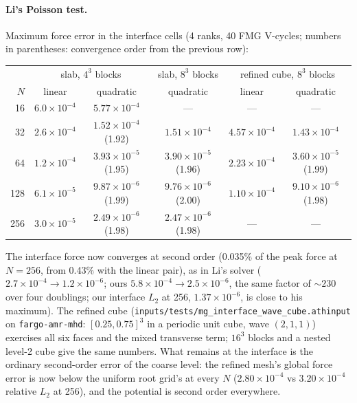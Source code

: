 \documentclass[11pt]{article}
\newcommand{\code}[1]{\texttt{#1}}
\newcommand{\file}[1]{\texttt{#1}}
\begin{document}
\paragraph{Li's Poisson test.} Maximum force error in the interface cells (4 ranks, 40 FMG
V-cycles; numbers in parentheses: convergence order from the previous row):
\begin{center}
\small
\begin{tabular}{@{}rccccc@{}}
\toprule
& \multicolumn{2}{c}{slab, $4^3$ blocks} & slab, $8^3$ blocks & \multicolumn{2}{c}{refined cube, $8^3$ blocks} \\
$N$ & linear & quadratic & quadratic & linear & quadratic \\
\midrule
16  & $6.0\times10^{-4}$ & $5.77\times10^{-4}$ & --- & --- & --- \\
32  & $2.6\times10^{-4}$ & $1.52\times10^{-4}$ (1.92) & $1.51\times10^{-4}$ & $4.57\times10^{-4}$ & $1.43\times10^{-4}$ \\
64  & $1.2\times10^{-4}$ & $3.93\times10^{-5}$ (1.95) & $3.90\times10^{-5}$ (1.96) & $2.23\times10^{-4}$ & $3.60\times10^{-5}$ (1.99) \\
128 & $6.1\times10^{-5}$ & $9.87\times10^{-6}$ (1.99) & $9.76\times10^{-6}$ (2.00) & $1.10\times10^{-4}$ & $9.10\times10^{-6}$ (1.98) \\
256 & $3.0\times10^{-5}$ & $2.49\times10^{-6}$ (1.98) & $2.47\times10^{-6}$ (1.98) & --- & --- \\
\bottomrule
\end{tabular}
\end{center}
The interface force now converges at second order (0.035\% of the peak force at $N = 256$, from
0.43\% with the linear pair), as in Li's solver ($2.7\times10^{-4} \to 1.2\times10^{-6}$; ours
$5.8\times10^{-4} \to 2.5\times10^{-6}$, the same factor of $\sim\!230$ over four doublings; our
interface $L_2$ at 256, $1.37\times10^{-6}$, is close to his maximum). The refined cube
(\file{inputs/tests/mg\_interface\_wave\_cube.athinput} on \code{fargo-amr-mhd}: $[0.25,0.75]^3$
in a periodic unit cube, wave $(2,1,1)$) exercises all six faces and the mixed transverse term;
$16^3$ blocks and a nested level-2 cube give the same numbers. What remains at the interface is
the ordinary second-order error of the coarse level: the refined mesh's global force error is now
below the uniform root grid's at every $N$ ($2.80\times10^{-4}$ vs $3.20\times10^{-4}$ relative
$L_2$ at 256), and the potential is second order everywhere.
\end{document}
